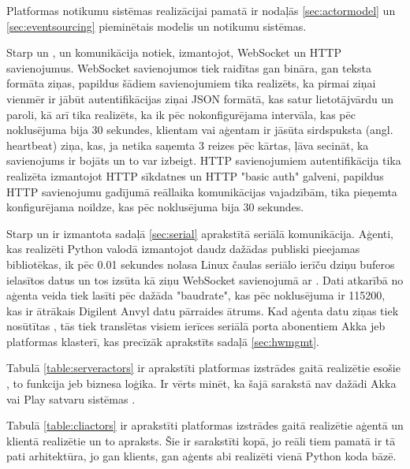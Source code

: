 Platformas notikumu sistēmas realizācijai pamatā ir nodaļās \ref{sec:actormodel}
un \ref{sec:eventsourcing} pieminētais  modelis un
notikumu sistēmas.

Starp  un , un
 komunikācija notiek, izmantojot, WebSocket un HTTP
savienojumus. WebSocket savienojumos tiek raidītas gan bināra, gan teksta
formāta ziņas, papildus šādiem savienojumiem tika realizēts, ka pirmai ziņai
vienmēr ir jābūt autentifikācijas ziņai JSON formātā, kas satur lietotājvārdu un
paroli, kā arī tika realizēts, ka ik pēc nokonfigurējama intervāla, kas pēc
noklusējuma bija 30 sekundes, klientam vai aģentam ir jāsūta sirdspuksta (angl.
heartbeat) ziņa, kas, ja netika saņemta 3 reizes pēc kārtas, ļāva secināt, ka
savienojums ir bojāts un to var izbeigt. HTTP savienojumiem autentifikācija tika
realizēta izmantojot HTTP sīkdatnes un HTTP "basic auth" galveni, papildus HTTP
savienojumu gadījumā reāllaika komunikācijas vajadzībām, tika pieņemta
konfigurējama noildze, kas pēc noklusējuma bija 30 sekundes.

Starp  un  ir izmantota sadaļā
\ref{sec:serial} aprakstītā seriālā komunikācija. Aģenti, kas realizēti Python
valodā izmantojot daudz dažādas publiski pieejamas bibliotēkas, ik pēc 0.01
sekundes nolasa Linux čaulas seriālo ierīču dziņu buferos ielasītos datus un tos
izsūta kā ziņu WebSocket savienojumā ar . Dati atkarībā
no aģenta veida tiek lasīti pēc dažāda "baudrate", kas pēc noklusējuma ir
115200, kas ir ātrākais Digilent Anvyl datu pārraides ātrums. Kad aģenta
 datu ziņas tiek nosūtītas ,
tās tiek translētas visiem ierīces seriālā porta abonentiem Akka jeb platformas
 klasterī, kas precīzāk aprakstīts sadaļā
\ref{sec:hwmgmt}.

Tabulā \ref{table:serveractors} ir aprakstīti platformas izstrādes gaitā
realizētie  esošie , to
funkcija jeb biznesa loģika. Ir vērts minēt, ka šajā sarakstā nav dažādi Akka
vai Play satvaru sistēmas .

Tabulā \ref{table:cliactors} ir aprakstīti platformas izstrādes gaitā realizētie
aģentā un klientā realizētie  un to apraksts. Šie
 ir sarakstīti kopā, jo reāli tiem pamatā ir tā pati
arhitektūra, jo gan klients, gan aģents abi realizēti vienā Python koda bāzē.

